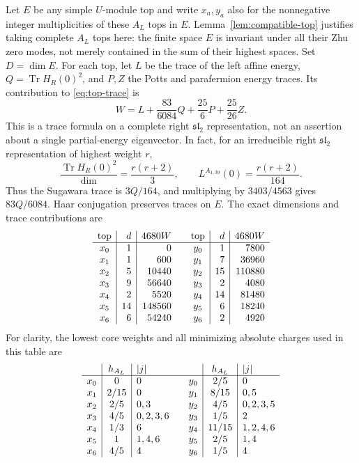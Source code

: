 Let $E$ be any simple $U$-module top and write $x_a,y_a$ also for the
nonnegative integer multiplicities of these $A_L$ tops in $E$.
Lemma~\ref{lem:compatible-top} justifies taking complete $A_L$ tops
here: the finite space $E$ is invariant under all their Zhu zero modes,
not merely contained in the sum of their highest spaces.
Set $D=\dim E$. For each top, let $L$ be the trace of the left affine
energy, $Q=\operatorname{Tr}H_R(0)^2$, and $P,Z$ the Potts and
parafermion energy traces. Its contribution to \eqref{eq:top-trace} is
\begin{equation}
 W=L+\frac{83}{6084}Q+\frac{25}{6}P+\frac{25}{26}Z.
 \label{eq:top-W}
\end{equation}
This is a trace formula on a complete right $\mathfrak{sl}_2$
representation, not an assertion about a single partial-energy
eigenvector. In fact, for an irreducible right $\mathfrak{sl}_2$
representation of highest weight $r$,
\[
 \frac{\operatorname{Tr}H_R(0)^2}{\dim}=\frac{r(r+2)}3,
 \qquad L^{A_{1,39}}(0)=\frac{r(r+2)}{164}.
\]
Thus the Sugawara trace is $3Q/164$, and multiplying by $3403/4563$
gives $83Q/6084$. Haar conjugation preserves traces on $E$.
The exact dimensions and trace contributions are
\[
\begin{array}{c|r|r@{\qquad}c|r|r}
 \text{top}&d&4680W&\text{top}&d&4680W\\\hline
 x_0&1&0&y_0&1&7800\\
 x_1&1&600&y_1&7&36960\\
 x_2&5&10440&y_2&15&110880\\
 x_3&9&56640&y_3&2&4080\\
 x_4&2&5520&y_4&14&81480\\
 x_5&14&148560&y_5&6&18240\\
 x_6&6&54240&y_6&2&4920
\end{array}
\]
For clarity, the lowest core weights and all minimizing absolute
charges used in this table are
\[
\begin{array}{c|c|l@{\qquad}c|c|l}
 &h_{A_L}&|j|&&h_{A_L}&|j|\\\hline
 x_0&0&0&y_0&2/5&0\\
 x_1&2/15&0&y_1&8/15&0,5\\
 x_2&2/5&0,3&y_2&4/5&0,2,3,5\\
 x_3&4/5&0,2,3,6&y_3&1/5&2\\
 x_4&1/3&6&y_4&11/15&1,2,4,6\\
 x_5&1&1,4,6&y_5&2/5&1,4\\
 x_6&4/5&4&y_6&1/5&4
\end{array}
\]
